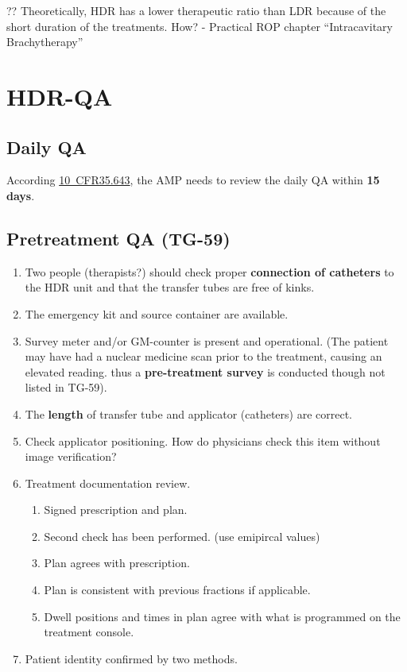 \documentclass[]{book}
\providecommand{\tightlist}{%
  \setlength{\itemsep}{0pt}\setlength{\parskip}{0pt}}
\theoremstyle{definition}
\theoremstyle{definition}
\theoremstyle{definition}
\theoremstyle{remark}
\begin{document}
?? Theoretically, HDR has a lower therapeutic ratio than LDR because of
the short duration of the treatments. How? - Practical ROP chapter
``Intracavitary Brachytherapy''

\section{HDR-QA}\label{hdr-qa}

\subsection{Daily QA}\label{daily-qa}

According
\href{https://www.nrc.gov/reading-rm/doc-collections/cfr/part035/part035-0643.html}{10~CFR35.643},
the AMP needs to review the daily QA within \textbf{15 days}.

\subsection{Pretreatment QA (TG-59)}\label{pretreatment-qa-tg-59}

\begin{enumerate}
\def\labelenumi{\arabic{enumi}.}
\tightlist
\item
  Two people (therapists?) should check proper \textbf{connection of
  catheters} to the HDR unit and that the transfer tubes are free of
  kinks.
\item
  The emergency kit and source container are available.
\item
  Survey meter and/or GM-counter is present and operational. (The
  patient may have had a nuclear medicine scan prior to the treatment,
  causing an elevated reading. thus a \textbf{pre-treatment survey} is
  conducted though not listed in TG-59).
\item
  The \textbf{length} of transfer tube and applicator (catheters) are
  correct.
\item
  Check applicator positioning. How do physicians check this item
  without image verification?
\item
  Treatment documentation review.

  \begin{enumerate}
  \def\labelenumii{\alph{enumii}.}
  \tightlist
  \item
    Signed prescription and plan.
  \item
    Second check has been performed. (use emipircal values)
  \item
    Plan agrees with prescription.
  \item
    Plan is consistent with previous fractions if applicable.
  \item
    Dwell positions and times in plan agree with what is programmed on
    the treatment console.
  \end{enumerate}
\item
  Patient identity confirmed by two methods.
\end{enumerate}
\end{document}
